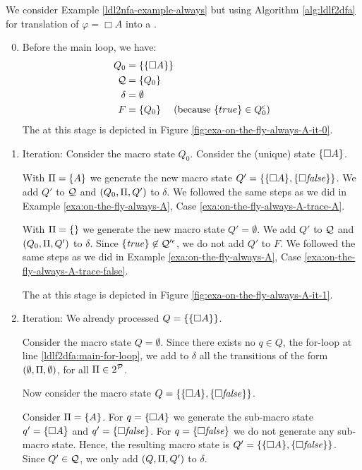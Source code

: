 \begin{example}
	We consider Example \ref{ldl2nfa-example-always} but using Algorithm \ref{alg:ldlf2dfa} for translation of $\varphi = \Box A$ into a \DFA.
	
	\begin{enumerate}
		\setcounter{enumi}{-1}
		\item Before the main loop, we have:
			\begin{align*}
			Q_0 &= \{\{\Box A\}\}\\
			\mathcal{Q}  &= \{Q_0\}\\
			\delta &= \emptyset\\
			F &= \{Q_0\} \hspace*{.18in} (\text{because } \{true\}\in Q_0^\epsilon)
			\end{align*}
		The \DFA at this stage is depicted in Figure \ref{fig:exa-on-the-fly-always-A-it-0}.
		
		\item Iteration: Consider the macro state $Q_0$. Consider the (unique) \NFA state $\{\Box A\}$. 
		
		With $\Pi = \{A\}$ we generate the new macro state $Q' = \{\{\Box A\}, \{\Box \mathit{false}\}\}$. We add $Q'$ to $\mathcal{Q}$ and $(Q_0, \Pi, Q')$ to $\delta$. We followed the same steps as we did in Example \ref{exa:on-the-fly-always-A}, Case \ref{exa:on-the-fly-always-A-trace-A}.
		
		With $\Pi = \{\}$ we generate the new macro state $Q' =\emptyset$.  We add $Q'$ to $\mathcal{Q}$ and $(Q_0, \Pi, Q')$ to $\delta$. Since $\{\mathit{true}\}\not\in\mathcal{Q}'^\epsilon$, we do not add $Q'$ to $F$. We followed the same steps as we did in Example \ref{exa:on-the-fly-always-A}, Case \ref{exa:on-the-fly-always-A-trace-false}.
		
		\medskip
		
		The \DFA at this stage is depicted in Figure \ref{fig:exa-on-the-fly-always-A-it-1}.
		
		\item Iteration: We already processed $Q=\{\{\Box A\}\}$.
		
		Consider the macro state $Q = \emptyset$. Since there exists no $q\in Q$, the for-loop at line \ref{ldlf2dfa:main-for-loop}, we add to $\delta$ all the transitions of the form $(\emptyset, \Pi, \emptyset)$, for all $\Pi \in 2^{\mathcal{P}}$.
 
		 Now consider the macro state $Q = \{\{\Box A\}, \{\Box \mathit{false}\}\}$. 
		
		Consider $\Pi = \{A\}$. For $q = \{\Box A\}$ we generate the sub-macro state $q' = \{\Box A\}$ and $q' = \{\Box \mathit{false}\}$. For $q = \{\Box \mathit{false}\}$ we do not generate any sub-macro state.
		Hence, the resulting macro state is $Q' = \{\{\Box A\}, \{\Box \mathit{false}\}\}$. Since $Q'\in \mathcal{Q}$, we only add $(Q, \Pi, Q')$ to $\delta$.
		

\end{enumerate}
\end{example}
